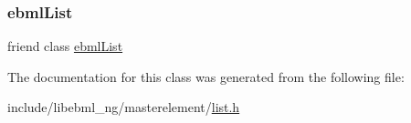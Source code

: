 \subsubsection{\texorpdfstring{ebml\+List}{ebmlList}}
{\footnotesize\ttfamily friend class \mbox{\hyperlink{classebml_1_1ebmlList}{ebml\+List}}\hspace{0.3cm}{\ttfamily [friend]}}



The documentation for this class was generated from the following file\+:\begin{DoxyCompactItemize}
\item 
include/libebml\+\_\+ng/masterelement/\mbox{\hyperlink{list_8h}{list.\+h}}\end{DoxyCompactItemize}
